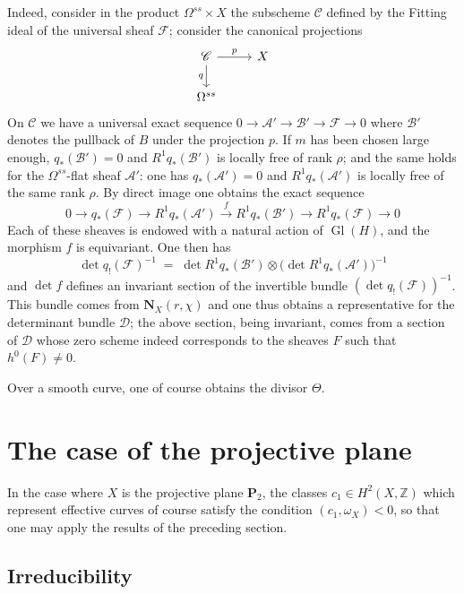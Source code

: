 \documentclass[12pt,english]{smfart}%
\theoremstyle{plain}
\theoremstyle{definition}
\theoremstyle{remark}
\newcommand{\PP}{\mathbf{P}}
\newcommand{\ZZ}{\mathbb{Z}}
\DeclareMathOperator{\Gl}{Gl}
\newcommand{\origpage}[1]{\marginnote{\scriptsize\itshape p.~#1}}
\begin{document}
Indeed, consider in the product $\Omega^{ss}\times X$ the subscheme $\mathscr{C}$ defined by the Fitting ideal of the universal sheaf $\mathscr{F}$; consider the canonical projections
\[
\begin{tikzcd}
\mathscr{C} \arrow[r,"p"] \arrow[d,"q"'] & X \\
\Omega^{ss} &
\end{tikzcd}
\]
On $\mathscr{C}$ we have a universal exact sequence $0\to\mathscr{A}'\to\mathscr{B}'\to\mathscr{F}\to 0$ where $\mathscr{B}'$ denotes the pullback of $B$ under the projection $p$. If $m$ has been chosen large enough, $q_{*}(\mathscr{B}')=0$ and $R^{1}q_{*}(\mathscr{B}')$ is locally free of rank $\rho$; and the same holds for the $\Omega^{ss}$-flat sheaf $\mathscr{A}'$: one has $q_{*}(\mathscr{A}')=0$ and $R^{1}q_{*}(\mathscr{A}')$ is locally free of the same rank $\rho$. By direct image one obtains the exact sequence
\[
0 \to q_{*}(\mathscr{F}) \to R^{1}q_{*}(\mathscr{A}')
\stackrel{f}{\longrightarrow} R^{1}q_{*}(\mathscr{B}') \to R^{1}q_{*}(\mathscr{F})
\to 0
\]
Each of these sheaves is endowed with a natural action of $\Gl(H)$, and the morphism $f$ is equivariant. One then has
\[
\det q_{!}(\mathscr{F})^{-1} \;=\; \det R^{1}q_{*}(\mathscr{B}') \otimes
\bigl(\det R^{1}q_{*}(\mathscr{A}')\bigr)^{-1}
\]
and $\det f$ defines an invariant section of the invertible bundle $(\det q_{!}(\mathscr{F}))^{-1}$. This bundle comes from $\mathbf{N}_{X}(r,\chi)$ and one thus obtains a representative for the determinant bundle $\mathscr{D}$; the above section, being invariant, comes from a
\origpage{644}%
section of $\mathscr{D}$ whose zero scheme indeed corresponds to the sheaves $F$ such that $h^{0}(F)\neq 0$.

Over a smooth curve, one of course obtains the divisor $\Theta$.

\section{The case of the projective plane}\label{sec:plane}

In the case where $X$ is the projective plane $\PP_{2}$, the classes $c_{1}\in H^{2}(X,\ZZ)$ which represent effective curves of course satisfy the condition $(c_{1},\omega_{X})<0$, so that one may apply the results of the preceding section.

\subsection{Irreducibility}\label{subsec:irreducibility}
\end{document}
